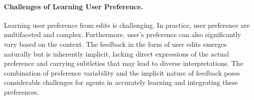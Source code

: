 \paragraph{Challenges of Learning User Preference.} Learning user preference from edits is challenging. In practice, user preference are multifaceted and complex. Furthermore, user's preference can also significantly vary based on the context. The feedback in the form of user edits emerges naturally but is inherently implicit, lacking direct expressions of the actual preference and carrying subtleties that may lead to diverse interpretations. The combination of preference variability and the implicit nature of feedback poses considerable challenges for agents in accurately learning and integrating these preferences.

